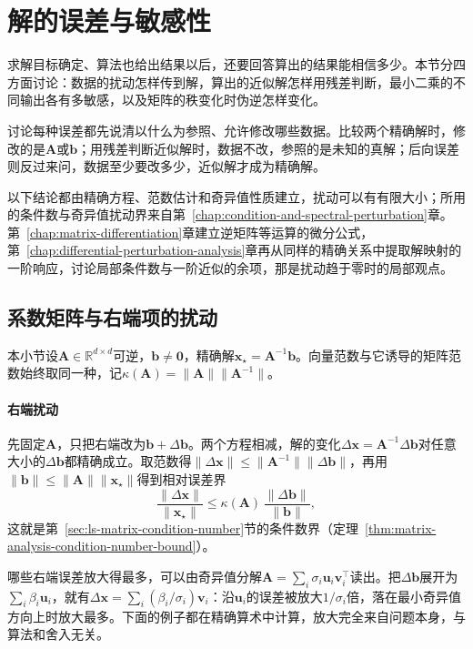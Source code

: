 \section{解的误差与敏感性}
\label{sec:ls-numerical-sensitivity}

求解目标确定、算法也给出结果以后，还要回答算出的结果能相信多少。本节分四方面讨论：数据的扰动怎样传到解，算出的近似解怎样用残差判断，最小二乘的不同输出各有多敏感，以及矩阵的秩变化时伪逆怎样变化。

讨论每种误差都先说清以什么为参照、允许修改哪些数据。比较两个精确解时，修改的是$\bm A$或$\bm b$；用残差判断近似解时，数据不改，参照的是未知的真解；后向误差则反过来问，数据至少要改多少，近似解才成为精确解。

以下结论都由精确方程、范数估计和奇异值性质建立，扰动可以有有限大小；所用的条件数与奇异值扰动界来自第~\ref{chap:condition-and-spectral-perturbation}章。第~\ref{chap:matrix-differentiation}章建立逆矩阵等运算的微分公式，第~\ref{chap:differential-perturbation-analysis}章再从同样的精确关系中提取解映射的一阶响应，讨论局部条件数与一阶近似的余项，那是扰动趋于零时的局部观点。

\subsection{系数矩阵与右端项的扰动}
\label{sec:ls-equation-sensitivity}

本小节设$\bm A\in\mathbb R^{d\times d}$可逆，$\bm b\ne\bm0$，精确解$\bm x_\star=\bm A^{-1}\bm b$。向量范数与它诱导的矩阵范数始终取同一种，记$\kappa(\bm A)=\lVert\bm A\rVert\lVert\bm A^{-1}\rVert$。

\paragraph{右端扰动}
先固定$\bm A$，只把右端改为$\bm b+\Delta\bm b$。两个方程相减，解的变化$\Delta\bm x=\bm A^{-1}\Delta\bm b$对任意大小的$\Delta\bm b$都精确成立。取范数得$\lVert\Delta\bm x\rVert\leq\lVert\bm A^{-1}\rVert\lVert\Delta\bm b\rVert$，再用$\lVert\bm b\rVert\leq\lVert\bm A\rVert\lVert\bm x_\star\rVert$得到相对误差界
\[
 \frac{\lVert\Delta\bm x\rVert}{\lVert\bm x_\star\rVert}\leq\kappa(\bm A)\,\frac{\lVert\Delta\bm b\rVert}{\lVert\bm b\rVert},
\]
这就是第~\ref{sec:ls-matrix-condition-number}节的条件数界（定理~\ref{thm:matrix-analysis-condition-number-bound}）。

哪些右端误差放大得最多，可以由奇异值分解$\bm A=\sum_i\sigma_i\bm u_i\bm v_i^\top$读出。把$\Delta\bm b$展开为$\sum_i\beta_i\bm u_i$，就有$\Delta\bm x=\sum_i(\beta_i/\sigma_i)\bm v_i$：沿$\bm u_i$的误差被放大$1/\sigma_i$倍，落在最小奇异值方向上时放大最多。下面的例子都在精确算术中计算，放大完全来自问题本身，与算法和舍入无关。

